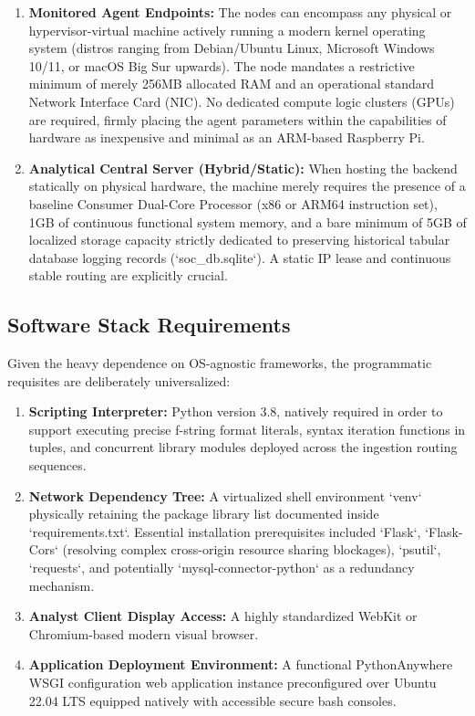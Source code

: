 \begin{enumerate}
    \item \textbf{Monitored Agent Endpoints:} The nodes can encompass any physical or hypervisor-virtual machine actively running a modern kernel operating system (distros ranging from Debian/Ubuntu Linux, Microsoft Windows 10/11, or macOS Big Sur upwards). The node mandates a restrictive minimum of merely 256MB allocated RAM and an operational standard Network Interface Card (NIC). No dedicated compute logic clusters (GPUs) are required, firmly placing the agent parameters within the capabilities of hardware as inexpensive and minimal as an ARM-based Raspberry Pi.
    \item \textbf{Analytical Central Server (Hybrid/Static):} When hosting the backend statically on physical hardware, the machine merely requires the presence of a baseline Consumer Dual-Core Processor (x86 or ARM64 instruction set), 1GB of continuous functional system memory, and a bare minimum of 5GB of localized storage capacity strictly dedicated to preserving historical tabular database logging records (`soc\_db.sqlite`). A static IP lease and continuous stable routing are explicitly crucial.
\end{enumerate}

\subsection{Software Stack Requirements}
Given the heavy dependence on OS-agnostic frameworks, the programmatic requisites are deliberately universalized:
\begin{enumerate}
    \item \textbf{Scripting Interpreter:} Python version 3.8, natively required in order to support executing precise f-string format literals, syntax iteration functions in tuples, and concurrent library modules deployed across the ingestion routing sequences.
    \item \textbf{Network Dependency Tree:} A virtualized shell environment `venv` physically retaining the package library list documented inside `requirements.txt`. Essential installation prerequisites included `Flask`, `Flask-Cors` (resolving complex cross-origin resource sharing blockages), `psutil`, `requests`, and potentially `mysql-connector-python` as a redundancy mechanism.
    \item \textbf{Analyst Client Display Access:} A highly standardized WebKit or Chromium-based modern visual browser.
    \item \textbf{Application Deployment Environment:} A functional PythonAnywhere WSGI configuration web application instance preconfigured over Ubuntu 22.04 LTS equipped natively with accessible secure bash consoles.
\end{enumerate}

